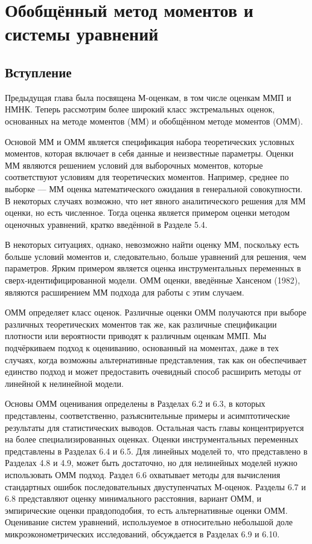 \chapter{Обобщённый метод моментов и системы уравнений}

\section{Вступление}

Предыдущая глава была посвящена М-оценкам, в том числе оценкам ММП и НМНК. Теперь рассмотрим более широкий класс экстремальных оценок, основанных на методе моментов (ММ) и обобщённом методе моментов (ОММ).

Основой ММ и ОММ является спецификация набора теоретических условных моментов,  которая включает в себя данные и неизвестные параметры. Оценки ММ являются решением условий для выборочных моментов, которые соответствуют условиям для теоретических моментов. Например, среднее по выборке --- ММ оценка математического ожидания в генеральной совокупности. В некоторых случаях возможно, что нет явного аналитического решения для ММ оценки, но есть численное. Тогда оценка является примером оценки методом оценочных уравнений, кратко введённой в Разделе 5.4.

В некоторых ситуациях, однако, невозможно найти оценку ММ, поскольку есть больше условий моментов и, следовательно, больше уравнений для решения, чем параметров. Ярким примером является оценка инструментальных переменных в сверх-идентифицированной модели. ОММ оценки, введённые Хансеном (1982), являются расширением ММ подхода для работы с этим случаем.

ОММ определяет класс оценок. Различные оценки ОММ получаются при выборе различных теоретических моментов так же, как различные спецификации плотности или вероятности приводят к различным оценкам ММП. Мы подчёркиваем подход к оцениванию, основанный на моментах, даже в тех случаях, когда возможны альтернативные представления, так как он обеспечивает единство подход и может предоставить очевидный способ расширить методы от линейной к нелинейной модели.

Основы ОММ оценивания определены в Разделах 6.2 и 6.3, в которых представлены, соответственно, разъяснительные примеры и асимптотические результаты для статистических выводов. Остальная часть главы концентрируется на более специализированных оценках. Оценки инструментальных переменных представлены в Разделах 6.4 и 6.5. Для линейных моделей то, что представлено в Разделах 4.8 и 4.9, может быть достаточно, но для нелинейных моделей нужно использовать ОММ подход. Раздел 6.6 охватывает методы для вычисления стандартных ошибок последовательных двуступенчатых М-оценок. Разделы 6.7 и 6.8 представляют оценку минимального расстояния, вариант ОММ, и эмпирические оценки правдоподобия, то есть альтернативные оценки ОММ. Оценивание систем уравнений, используемое в относительно небольшой доле микроэконометрических исследований, обсуждается в Разделах 6.9 и 6.10.


